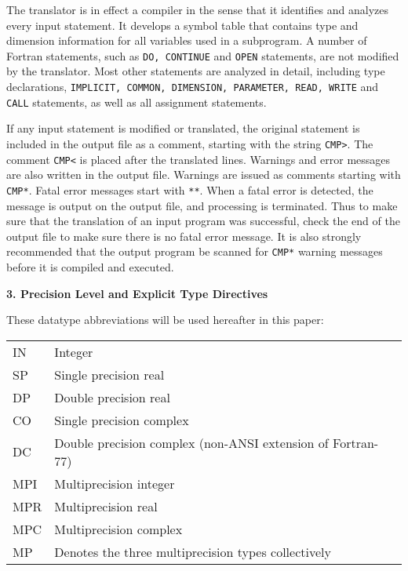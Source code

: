 The translator is in effect a compiler in the sense that it identifies
and analyzes every input statement.  It develops a symbol table that
contains type and dimension information for all variables used in a
subprogram.  A number of Fortran statements, such as {\tt DO,
CONTINUE} and {\tt OPEN} statements, are not modified by the
translator.  Most other statements are analyzed in detail, including
type declarations, {\tt IMPLICIT, COMMON, DIMENSION, PARAMETER, READ,
WRITE} and {\tt CALL} statements, as well as all assignment
statements.

If any input statement is modified or translated, the original
statement is included in the output file as a comment, starting with
the string {\tt CMP>}.  The comment {\tt CMP<} is placed after the
translated lines.  Warnings and error messages are also written in the
output file.  Warnings are issued as comments starting with {\tt
CMP*}.  Fatal error messages start with {\tt ***}.  When a fatal error
is detected, the message is output on the output file, and processing
is terminated.  Thus to make sure that the translation of an input
program was successful, check the end of the output file to make sure
there is no fatal error message.  It is also strongly recommended that
the output program be scanned for {\tt CMP*} warning messages before
it is compiled and executed.
 
\vspace{2ex} \noindent
{\bf 3. Precision Level and Explicit Type Directives}
 
These datatype abbreviations will be used hereafter in this paper:
 
\vspace{2ex}

\begin{tabular}{ll}
   IN \hspace*{5mm} &  Integer \\ 
   SP  &  Single precision real \\
   DP  &  Double precision real \\
   CO  &  Single precision complex \\
   DC  &  Double precision complex (non-ANSI extension of Fortran-77) \\
   MPI &  Multiprecision integer \\
   MPR &  Multiprecision real \\
   MPC &  Multiprecision complex \\
   MP  &  Denotes the three multiprecision types collectively \\
\end{tabular}

